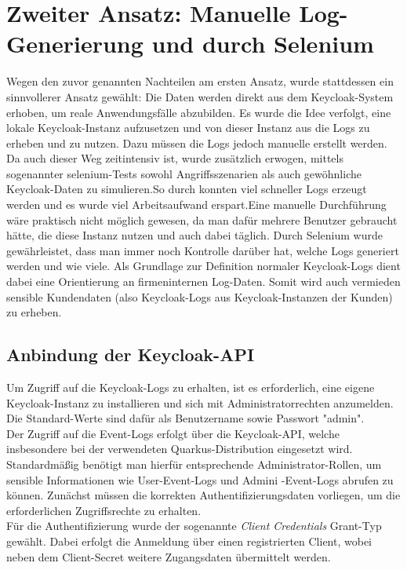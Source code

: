 \documentclass[a4paper,12pt]{article}
\begin{document}
	\section{Zweiter Ansatz: Manuelle Log-Generierung und durch Selenium}
	Wegen den zuvor genannten Nachteilen am ersten Ansatz, wurde stattdessen ein sinnvollerer Ansatz gewählt: Die Daten werden direkt aus dem Keycloak-System erhoben, um reale Anwendungsfälle abzubilden. Es wurde die Idee verfolgt, eine lokale Keycloak-Instanz aufzusetzen und von dieser Instanz aus die Logs zu erheben und zu nutzen. Dazu müssen die Logs jedoch manuelle erstellt werden. Da auch dieser Weg zeitintensiv ist, wurde zusätzlich erwogen, mittels sogenannter \gls{selenium}-Tests sowohl Angriffsszenarien als auch gewöhnliche Keycloak-Daten zu simulieren.So durch konnten viel schneller Logs erzeugt werden und es wurde viel Arbeitsaufwand erspart.Eine manuelle Durchführung wäre praktisch nicht möglich gewesen, da man dafür mehrere Benutzer gebraucht hätte, die diese Instanz nutzen und auch dabei täglich. Durch Selenium wurde gewährleistet, dass man immer noch Kontrolle darüber hat, welche Logs generiert werden und wie viele. Als Grundlage zur Definition normaler Keycloak-Logs dient dabei eine Orientierung an firmeninternen Log-Daten. Somit wird auch vermieden sensible Kundendaten (also Keycloak-Logs aus Keycloak-Instanzen der Kunden) zu erheben.
	
	\subsection{Anbindung der Keycloak-API}
	Um Zugriff auf die Keycloak-Logs zu erhalten, ist es erforderlich, eine eigene Keycloak-Instanz zu installieren und sich mit Administratorrechten anzumelden. Die Standard-Werte sind dafür als Benutzername sowie Passwort "admin".
	\\[0.5em]
	Der Zugriff auf die Event-Logs erfolgt über die Keycloak-API, welche insbesondere bei der verwendeten Quarkus-Distribution eingesetzt wird. Standardmäßig benötigt man hierfür entsprechende Administrator-Rollen, um sensible Informationen wie User-Event-Logs und Admini
	-Event-Logs abrufen zu können. Zunächst müssen die korrekten Authentifizierungsdaten vorliegen, um die erforderlichen Zugriffsrechte zu erhalten.
	\\[0.5em]
	Für die Authentifizierung wurde der sogenannte \textit{Client Credentials} Grant-Typ gewählt. Dabei erfolgt die Anmeldung über einen registrierten Client, wobei neben dem Client-Secret weitere Zugangsdaten übermittelt werden.
\end{document}
